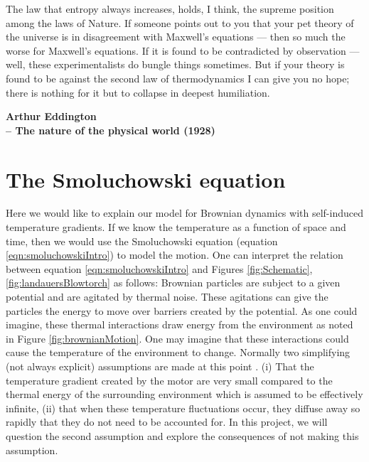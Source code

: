 \epigraph{The law that entropy always increases, holds, I think, the supreme position among the laws of Nature. If someone points out to you that your pet theory of the universe is in disagreement with Maxwell's equations — then so much the worse for Maxwell's equations. If it is found to be contradicted by observation — well, these experimentalists do bungle things sometimes. But if your theory is found to be against the second law of thermodynamics I can give you no hope; there is nothing for it but to collapse in deepest humiliation.}{\textbf{Arthur Eddington \\ -- The nature of the physical world (1928)}}


\section{The Smoluchowski equation} \label{Smoluchowski}
Here we would like to explain our model for Brownian dynamics with self-induced temperature gradients. If we know the temperature as a function of space and time, then we would use the Smoluchowski equation (equation \ref{eqn:smoluchowskiIntro}) to model the motion. One can interpret the relation between equation \ref{eqn:smoluchowskiIntro} and Figures \ref{fig:Schematic}, \ref{fig:landauersBlowtorch} as follows: Brownian particles are subject to a given potential and are agitated by thermal noise. These agitations can give the particles the energy to move over barriers created by the potential. As one could imagine, these thermal interactions draw energy from the environment as noted in Figure \ref{fig:brownianMotion}. One may imagine that these interactions could cause the temperature of the environment to change. Normally two simplifying (not always explicit) assumptions are made at this point \cite{Reimann2001}. (i) That the temperature gradient created by the motor are very small compared to the thermal energy of the surrounding environment which is assumed to be effectively infinite, (ii) that when these temperature fluctuations occur, they diffuse away so rapidly that they do not need to be accounted for. In this project, we will question the second assumption and explore the consequences of not making this assumption.

